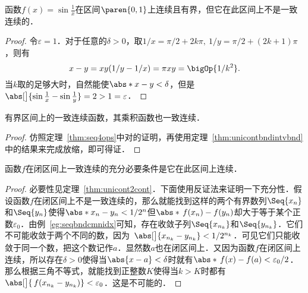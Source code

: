 \begin{example}
  \label{eg:uniconttoposine}
  函数\(f(x) = \sin\frac1x\)在区间\(\paren{0,1}\)上连续且有界，但它在此区间上不是一致连续的．

  \begin{proof}
    令\(\varepsilon = 1\)．对于任意的\(\delta > 0\)，取\(1/x = \pi/2 + 2k\pi,\ 1/y = \pi/2 + (2k+1)\pi\)，则有
    \begin{equation*}
      x - y = xy(1/y - 1/x) = \pi xy = \bigOp{1/k^2}.
    \end{equation*}
    当\(k\)取的足够大时，自然能使\(\abs*{x-y} < \delta\)，但是\(\abs[\big]{\sin\frac1x - \sin\frac1y} = 2 > 1 = \varepsilon\)．
  \end{proof}
\end{example}

\begin{theorem*}
  有界区间上的一致连续函数，其乘积函数也一致连续．

  \begin{proof}
    仿照定理~\ref{thm:seq4ops}中对的证明，再使用定理~\ref{thm:unicontbndintvbnd}中的结果来完成放缩，即可得证．
  \end{proof}
\end{theorem*}

\begin{theorem}
  \label{thm:hc}
  函数\(f\)在闭区间上一致连续的充分必要条件是它在此区间上连续．

  \begin{proof}
    必要性见定理~\ref{thm:unicont2cont}．下面使用反证法来证明一下充分性．假设函数\(f\)在闭区间上不是一致连续的，那么就能找到这样的两个有界数列\(\Seq{x_n}\)和\(\Seq{y_n}\)使得\(\abs*{x_n - y_n} < 1/2^n\)但\(\abs*{\,f(x_n) - f(y_n)}\)却大于等于某个正数\(\varepsilon_0\)．由例~\ref{eg:seqbndcmnidx}可知，存在收敛子列\(\Seq{x_{n_k}}\)和\(\Seq{y_{n_k}}\)．它们不可能收敛于两个不同的数，因为~\(\abs[\big]{x_{n_k} - y_{n_k}} < 1/2^{n_k}\)．可见它们只能收敛于同一个数，把这个数记作\(a\)．显然数\(a\)也在闭区间上．又因为函数\(f\)在闭区间上连续，所以存在\(\delta > 0\)使得当\(\abs{x-a} < \delta\)时就有\(\abs*{\,f(x)-f(a)} < \varepsilon_0/2\)．那么根据三角不等式，就能找到正整数\(K\)使得当\(k > K\)时都有\(\abs[\big]{\,f(x_{n_k} - y_{n_k})} < \varepsilon_0\)．这是不可能的．
  \end{proof}
\end{theorem}

